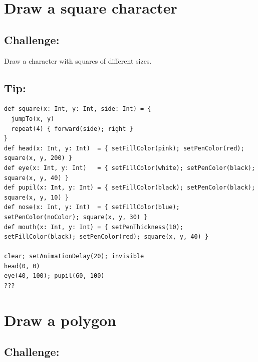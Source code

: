 \chapter{Draw a square character}\section*{\color{BrickRed}Challenge:}
Draw a character with squares of different sizes.
\\


  
\section*{\color{OliveGreen}Tip:}

\begin{lstlisting}[basicstyle={\ttfamily\fontsize{14}{17}\selectfont},numbers=none]
def square(x: Int, y: Int, side: Int) = {
  jumpTo(x, y)
  repeat(4) { forward(side); right }
}
def head(x: Int, y: Int)  = { setFillColor(pink); setPenColor(red); square(x, y, 200) }
def eye(x: Int, y: Int)   = { setFillColor(white); setPenColor(black); square(x, y, 40) }
def pupil(x: Int, y: Int) = { setFillColor(black); setPenColor(black); square(x, y, 10) }
def nose(x: Int, y: Int)  = { setFillColor(blue); setPenColor(noColor); square(x, y, 30) }
def mouth(x: Int, y: Int) = { setPenThickness(10); setFillColor(black); setPenColor(red); square(x, y, 40) }

clear; setAnimationDelay(20); invisible
head(0, 0)
eye(40, 100); pupil(60, 100)
???
\end{lstlisting}
        
\chapter{Draw a polygon}\section*{\color{BrickRed}Challenge:}


